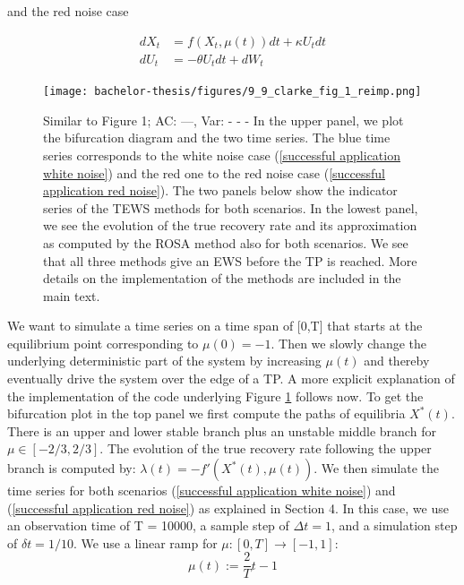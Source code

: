 \documentclass[%
thesis=student,%
coverpage=false,%
titlepage=false,%
headmarks=true, %
english,%
font=libertine, %
math=newpxtx, %
BCOR=5mm,%
coverBCOR=11mm%
]{tumbook}
\begin{document}
and the red noise case

    \begin{equation}
        \begin{aligned}
            dX_{t} & = f(X_{t},\mu(t))dt + \kappa U_{t}dt \\
            dU_{t} & = -\theta U_{t} dt + dW_{t}
        \end{aligned}
        \label{successful application red noise}
    \end{equation}



\begin{figure}
    \centering
    \texttt{[image: bachelor-thesis/figures/9\_9\_clarke\_fig\_1\_reimp.png]}
    \caption{Similar to \cite{Clarke:2023} Figure 1; AC: ---, Var: - - -
    In the upper panel, we plot the bifurcation diagram and the two time series. The blue time series corresponds to the white noise case (\ref{successful application white noise}) and the red one to the red noise case (\ref{successful application red noise}). The two panels below show the indicator series of the TEWS methods for both scenarios. In the lowest panel, we see the evolution of the true recovery rate and its approximation as computed by the ROSA method also for both scenarios. We see that all three methods give an EWS before the TP is reached. More details on the implementation of the methods are included in the main text.
    }
    \label{success_of_trad_ews_and_rosa}
\end{figure}

We want to simulate a time series on a time span of [0,T] that starts at the equilibrium point corresponding to $\mu(0) = -1$. Then we slowly change the underlying deterministic part of the system by increasing $\mu(t)$ and thereby eventually drive the system over the edge of a TP. A more explicit explanation of the implementation of the code underlying Figure \ref{success_of_trad_ews_and_rosa} follows now. To get the bifurcation plot in the top panel we first compute the paths of equilibria $X^{*}(t)$. There is an upper and lower stable branch plus an unstable middle branch for $\mu \in [-2/3,2/3]$. The evolution of the true recovery rate following the upper branch is computed by: $\lambda(t) = -f'(X^{*}(t),\mu(t))$. We then simulate the time series for both scenarios (\ref{successful application white noise}) and (\ref{successful application red noise}) as explained in Section 4. In this case, we use an observation time of T = 10000, a sample step of $\Delta t = 1$, and a simulation step of $\delta t = 1/10$. We use a linear ramp for $\mu:  [0,T] \rightarrow [-1,1]$:
\[
\mu(t) := \frac{2}{T}t-1
\]
\end{document}
